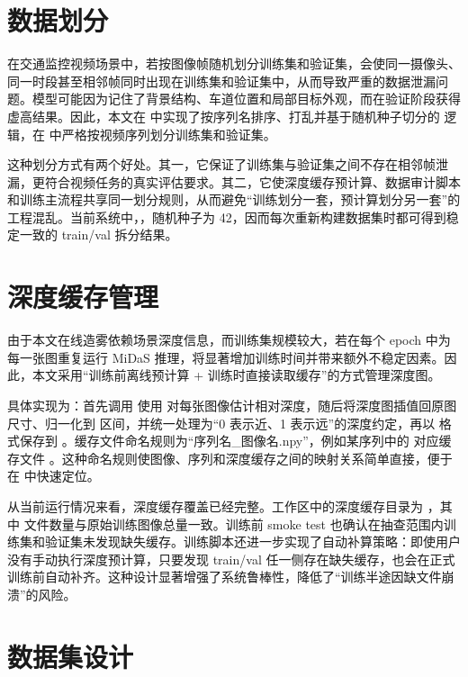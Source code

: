 \section{数据划分}

在交通监控视频场景中，若按图像帧随机划分训练集和验证集，会使同一摄像头、同一时段甚至相邻帧同时出现在训练集和验证集中，从而导致严重的数据泄漏问题。模型可能因为记住了背景结构、车道位置和局部目标外观，而在验证阶段获得虚高结果。因此，本文在  中实现了按序列名排序、打乱并基于随机种子切分的  逻辑，在  中严格按视频序列划分训练集和验证集\cite{uadetrac}。

这种划分方式有两个好处。其一，它保证了训练集与验证集之间不存在相邻帧泄漏，更符合视频任务的真实评估要求。其二，它使深度缓存预计算、数据审计脚本和训练主流程共享同一划分规则，从而避免“训练划分一套，预计算划分另一套”的工程混乱。当前系统中，，随机种子为 42，因而每次重新构建数据集时都可得到稳定一致的 train/val 拆分结果。

\section{深度缓存管理}

由于本文在线造雾依赖场景深度信息，而训练集规模较大，若在每个 epoch 中为每一张图重复运行 MiDaS 推理，将显著增加训练时间并带来额外不稳定因素。因此，本文采用“训练前离线预计算 + 训练时直接读取缓存”的方式管理深度图\cite{midas}。

具体实现为：首先调用  使用  对每张图像估计相对深度，随后将深度图插值回原图尺寸、归一化到 \code{[0,1]} 区间，并统一处理为“0 表示近、1 表示远”的深度约定，再以  格式保存到 。缓存文件命名规则为“序列名\_图像名.npy”，例如某序列中的  对应缓存文件 。这种命名规则使图像、序列和深度缓存之间的映射关系简单直接，便于在  中快速定位。

从当前运行情况来看，深度缓存覆盖已经完整。工作区中的深度缓存目录为 ，其中  文件数量与原始训练图像总量一致。训练前 smoke test 也确认在抽查范围内训练集和验证集未发现缺失缓存。训练脚本还进一步实现了自动补算策略：即使用户没有手动执行深度预计算，只要发现 train/val 任一侧存在缺失缓存，也会在正式训练前自动补齐。这种设计显著增强了系统鲁棒性，降低了“训练半途因缺文件崩溃”的风险。

\section{数据集设计}

